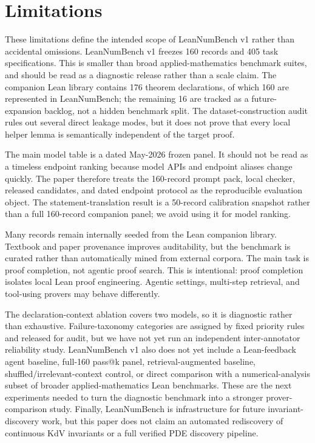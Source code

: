 \documentclass{article}
\begin{document}
\section{Limitations}

These limitations define the intended scope of LeanNumBench v1 rather than
accidental omissions. LeanNumBench v1 freezes 160 records and 405 task
specifications. This is smaller than broad applied-mathematics benchmark
suites, and should be read as a diagnostic release rather than a scale claim.
The companion Lean library contains 176 theorem declarations, of which
160 are represented in LeanNumBench; the remaining 16 are tracked as a
future-expansion backlog, not a hidden benchmark split. The
dataset-construction audit rules out several direct leakage modes, but it does
not prove that every local helper lemma is semantically independent of the
target proof.

The main model table is a dated May-2026 frozen panel. It should not be read
as a timeless endpoint ranking because model APIs and endpoint aliases change
quickly. The paper therefore treats the 160-record prompt pack, local checker,
released candidates, and dated endpoint protocol as the reproducible
evaluation object. The statement-translation result is a 50-record calibration
snapshot rather than a full 160-record companion panel; we avoid using it for
model ranking.

Many records remain internally seeded from the Lean companion library.
Textbook and paper provenance improves auditability, but the benchmark is
curated rather than automatically mined from external corpora. The main task
is proof completion, not agentic proof search. This is intentional: proof
completion isolates local Lean proof engineering. Agentic settings,
multi-step retrieval, and tool-using provers may behave differently.

The declaration-context ablation covers two models, so it is diagnostic rather
than exhaustive. Failure-taxonomy categories are assigned by fixed priority
rules and released for audit, but we have not yet run an independent
inter-annotator reliability study. LeanNumBench v1 also does not yet include a
Lean-feedback agent baseline, full-160 pass@k panel, retrieval-augmented
baseline, shuffled/irrelevant-context control, or direct comparison with a
numerical-analysis subset of broader applied-mathematics Lean benchmarks.
These are the next experiments needed to turn the diagnostic benchmark into a
stronger prover-comparison study. Finally, LeanNumBench is infrastructure for
future invariant-discovery work, but this paper does not claim an automated
rediscovery of continuous KdV invariants or a full verified PDE discovery
pipeline.
\end{document}
